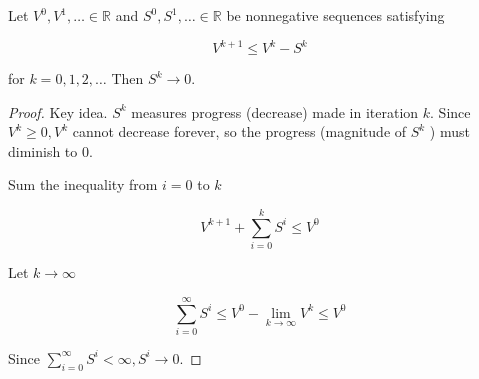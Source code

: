 \documentclass{report}
\begin{document}
\begin{theorem}
    Let $V^{0}, V^{1}, \ldots \in \mathbb{R}$ and $S^{0}, S^{1}, \ldots \in \mathbb{R}$ be nonnegative sequences satisfying

    $$
    V^{k+1} \leq V^{k}-S^{k}
    $$

    for $k=0,1,2, \ldots$ Then $S^{k} \rightarrow 0$.

    \begin{proof}
        Key idea. $S^{k}$ measures progress (decrease) made in iteration $k$. Since $V^{k} \geq 0, V^{k}$ cannot decrease forever, so the progress (magnitude of $S^{k}$ ) must diminish to 0.

        Sum the inequality from $i=0$ to $k$

        $$
        V^{k+1}+\sum_{i=0}^{k} S^{i} \leq V^{0}
        $$

        Let $k \rightarrow \infty$

        $$
        \sum_{i=0}^{\infty} S^{i} \leq V^{0}-\lim _{k \rightarrow \infty} V^{k} \leq V^{0}
        $$

        Since $\sum_{i=0}^{\infty} S^{i}<\infty, S^{i} \rightarrow 0$.
    \end{proof}
\end{theorem}
\end{document}
